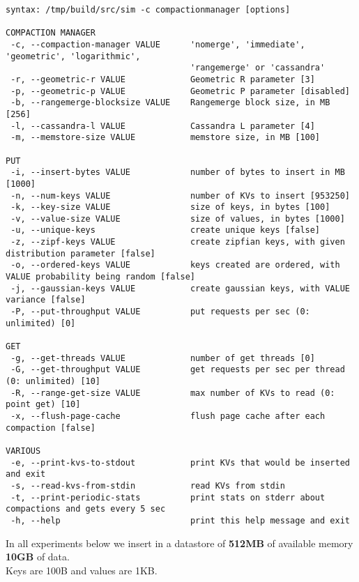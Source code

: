 \documentclass[11pt]{article}
\begin{document}
\footnotesize
\begin{verbatim}
syntax: /tmp/build/src/sim -c compactionmanager [options]

COMPACTION MANAGER
 -c, --compaction-manager VALUE      'nomerge', 'immediate', 'geometric', 'logarithmic',
                                     'rangemerge' or 'cassandra'
 -r, --geometric-r VALUE             Geometric R parameter [3]
 -p, --geometric-p VALUE             Geometric P parameter [disabled]
 -b, --rangemerge-blocksize VALUE    Rangemerge block size, in MB [256]
 -l, --cassandra-l VALUE             Cassandra L parameter [4]
 -m, --memstore-size VALUE           memstore size, in MB [100]

PUT
 -i, --insert-bytes VALUE            number of bytes to insert in MB [1000]
 -n, --num-keys VALUE                number of KVs to insert [953250]
 -k, --key-size VALUE                size of keys, in bytes [100]
 -v, --value-size VALUE              size of values, in bytes [1000]
 -u, --unique-keys                   create unique keys [false]
 -z, --zipf-keys VALUE               create zipfian keys, with given distribution parameter [false]
 -o, --ordered-keys VALUE            keys created are ordered, with VALUE probability being random [false]
 -j, --gaussian-keys VALUE           create gaussian keys, with VALUE variance [false]
 -P, --put-throughput VALUE          put requests per sec (0: unlimited) [0]

GET
 -g, --get-threads VALUE             number of get threads [0]
 -G, --get-throughput VALUE          get requests per sec per thread (0: unlimited) [10]
 -R, --range-get-size VALUE          max number of KVs to read (0: point get) [10]
 -x, --flush-page-cache              flush page cache after each compaction [false]

VARIOUS
 -e, --print-kvs-to-stdout           print KVs that would be inserted and exit
 -s, --read-kvs-from-stdin           read KVs from stdin
 -t, --print-periodic-stats          print stats on stderr about compactions and gets every 5 sec
 -h, --help                          print this help message and exit

\end{verbatim}

In all experiments below we insert in a datastore of \textbf{512MB} of available
memory \textbf{10GB} of data. \\
Keys are 100B and values are 1KB.

\clearpage

\end{document}
